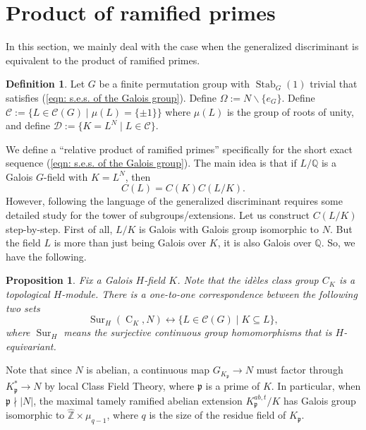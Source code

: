 \documentclass[12pt,a4paper]{amsart}
\numberwithin{equation}{section}%
\theoremstyle{plain}%
\newtheorem{proposition}[theorem]{Proposition}%
\theoremstyle{definition}%
\newtheorem{definition}[theorem]{Definition}%
\theoremstyle{remark}%
\begin{document}
    \section{Product of ramified primes}\label{section: product of ramified primes}
    In this section, we mainly deal with the case when the generalized discriminant is equivalent to the product of ramified primes.
    \begin{definition}\label{def: notations of S6}
    	Let $G$ be a finite permutation group with $\operatorname{Stab}_{G}(1)$ trivial that satisfies (\ref{eqn: s.e.s. of the Galois group}).
    	Define $\Omega:=N\backslash\{e_{G}\}$.
    	Define $\mathcal{C}:=\{L\in\mathcal{C}(G)\mid \mu(L)=\{\pm1\}\}$ where $\mu(L)$ is the group of roots of unity, and define $\mathcal{D}:=\{K=L^{N}\mid L\in\mathcal{C}\}$.
    \end{definition}
    We define a ``relative product of ramified primes'' specifically for the short exact sequence (\ref{eqn: s.e.s. of the Galois group}).
    The main idea is that if $L/\mathbb{Q}$ is a Galois $G$-field with $K=L^{N}$, then
    \begin{equation*}
    	C(L)=C(K)C(L/K).
    \end{equation*}
    However, following the language of the generalized discriminant requires some detailed study for the tower of subgroups/extensions.
    Let us construct $C(L/K)$ step-by-step.
    First of all, $L/K$ is Galois with Galois group isomorphic to $N$.
    But the field $L$ is more than just being Galois over $K$, it is also Galois over $\mathbb{Q}$.
    So, we have the following.
    \begin{proposition}\cite[Proposition 7.6]{wang2026invariant}
    	Fix a Galois $H$-field $K$.
    	Note that the id{\`e}les class group $C_{K}$ is a topological $H$-module.
    	There is a one-to-one correspondence between the following two sets
    	\begin{equation*}
    		\operatorname{Sur}_{H}(\operatorname{C}_{K},N)\leftrightarrow\{L\in\mathcal{C}(G)\mid K\subseteq L\},
    	\end{equation*}
    	where $\operatorname{Sur}_{H}$ means the surjective continuous group homomorphisms that is $H$-equivariant.
    \end{proposition}
    Note that since $N$ is abelian, a continuous map $G_{K_{\mathfrak{p}}}\to N$ must factor through $K_{\mathfrak{p}}^{*}\to N$ by local Class Field Theory, where $\mathfrak{p}$ is a prime of $K$.
    In particular, when $\mathfrak{p}\nmid\lvert N\rvert$, the maximal tamely ramified abelian extension $K_{\mathfrak{p}}^{ab,t}/K$ has Galois group isomorphic to $\hat{\mathbb{Z}}\times\mu_{q-1}$, where $q$ is the size of the residue field of $K_{\mathfrak{p}}$.
\end{document}
